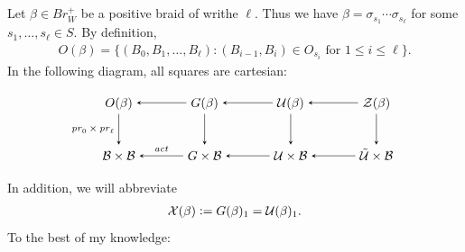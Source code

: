 \documentclass[a4paper,10pt,leqno]{amsart}
\theoremstyle{plain}
\theoremstyle{plain}
\theoremstyle{plain}
\theoremstyle{definition}
\theoremstyle{remark}
\newcommand{\Br}{\mathit{Br}}
\newcommand{\act}{\mathit{act}}
\renewcommand{\pr}{\mathit{pr}}
\begin{document}
\subsection{}

Let $\beta \in \Br_W^+$ be a positive braid of writhe $\ell$.
Thus we have $\beta = \sigma_{s_1} \cdots \sigma_{s_\ell}$ for some $s_1, \ldots, s_\ell \in S$.
By definition,
\begin{align}
O(\beta) = \{(B_0, B_1, \ldots, B_\ell) : \text{$(B_{i - 1}, B_i) \in O_{s_i}$ for $1 \leq i \leq \ell$}\}.
\end{align}
In the following diagram, all squares are cartesian:
\begin{equation}
\begin{tikzpicture}[baseline=(current bounding box.center), >=stealth]
\matrix(m)[matrix of math nodes, row sep=2.5em, column sep=3.5em, text height=2ex, text depth=0.5ex]
{	O(\beta)
		&G(\beta)
		&\cal{U}(\beta)
		&\cal{Z}(\beta)\\
	\cal{B} \times \cal{B}
		&G \times \cal{B}
		&\cal{U} \times \cal{B}
		&\tilde{\cal{U}} \times \cal{B}\\
		};
\path[->,font=\scriptsize, auto]
(m-1-2)		edge (m-1-1)
(m-1-3) 	edge (m-1-2)
(m-1-4) 	edge (m-1-3)
(m-1-1)		edge node[left]{$\pr_0 \times \pr_\ell$} (m-2-1)
(m-1-2)		edge (m-2-2)
(m-1-3) 	edge (m-2-3)			
(m-1-4) 	edge (m-2-4)
(m-2-2)		edge node[above]{$\act$} (m-2-1)
(m-2-3)		edge (m-2-2)
(m-2-4)		edge (m-2-3);
\end{tikzpicture}
\end{equation}
In addition, we will abbreviate
\begin{align}
\cal{X}(\beta) \vcentcolon= G(\beta)_1 = \cal{U}(\beta)_1.
\end{align}
To the best of my knowledge:
\end{document}
